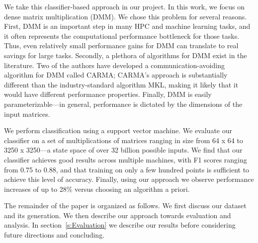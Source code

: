 We take this classifier-based approach in our project.
In this work, we focus on dense matrix multiplication (DMM).
We chose this problem for several reasons.
First, DMM is an important step in many HPC and machine learning tasks, and it often represents the computational performance bottleneck for those tasks.
Thus, even relatively small performance gains for DMM can translate to real savings for large tasks.
Secondly, a plethora of algorithms for DMM exist in the literature.
Two of the authors have developed a communication-avoiding algorithm for DMM called CARMA; CARMA's approach is substantially different than the industry-standard algorithm MKL, making it likely that it would have different performance properties.
Finally, DMM is easily parameterizable---in general, performance is dictated by the dimensions of the input matrices.

We perform classification using a support vector machine.
We evaluate our classifier on a set of multiplications of matrices ranging in size from 64 x 64 to 3250 x 3250---a state space of over 32 billion possible inputs.
We find that our classifier achieves good results across multiple machines, with F1 scores ranging from 0.75 to 0.88, and that training on only a few hundred points is sufficient to achieve this level of accuracy.
Finally, using our approach we observe performance increases of up to 28\% versus choosing an algorithm a priori.

The remainder of the paper is organized as follows.
We first discuss our dataset and its generation.
We then describe our approach towards evaluation and analysis.
In section~\ref{s:Evaluation} we describe our results before considering future directions and concluding.
